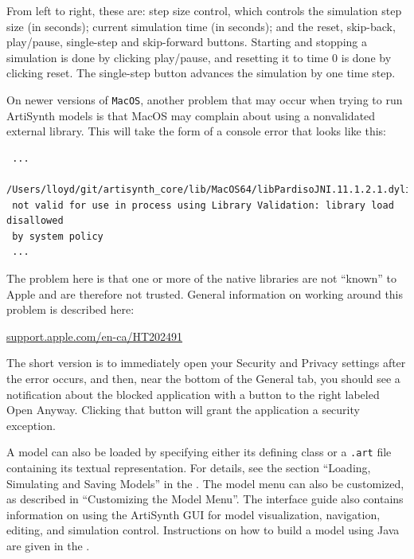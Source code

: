 From left to right, these are: step size control, which controls the
simulation step size (in seconds); current simulation time (in
seconds); and the {\sf reset}, {\sf skip-back}, {\sf play/pause}, {\sf
single-step} and {\sf skip-forward} buttons.  Starting and stopping a
simulation is done by clicking {\sf play/pause}, and resetting it to
time 0 is done by clicking {\sf reset}.  The {\sf single-step} button
advances the simulation by one time step.

\ifMacOS

\begin{sideblock}
On newer versions of {\tt MacOS}, another problem that may occur when
trying to run ArtiSynth models is that MacOS may complain about using
a nonvalidated external library. This will take the form of a console
error that looks like this:
\begin{verbatim}
 ...
 /Users/lloyd/git/artisynth_core/lib/MacOS64/libPardisoJNI.11.1.2.1.dylib)
 not valid for use in process using Library Validation: library load disallowed
 by system policy 
 ...
\end{verbatim}
The problem here is that one or more of the native libraries are not
``known'' to Apple and are therefore not trusted. General information
on working around this problem is described here:

\href{https://support.apple.com/en-ca/HT202491}{support.apple.com/en-ca/HT202491}

The short version is to immediately open your Security and Privacy
settings after the error occurs, and then, near the bottom of the {\sf
General} tab, you should see a notification about the blocked
application with a button to the right labeled {\sf Open
Anyway}. Clicking that button will grant the application a security
exception.
\end{sideblock}

\fi

A model can also be loaded by specifying either its defining class or
a {\tt .art} file containing its textual representation.  For details,
see the section ``Loading, Simulating and Saving Models'' in
the .  The
model menu can also be customized, as described in ``Customizing the
Model Menu''. The interface guide also contains information on using
the ArtiSynth GUI for model visualization, navigation, editing, and
simulation control. Instructions on how to build a model using Java
are given in the .

